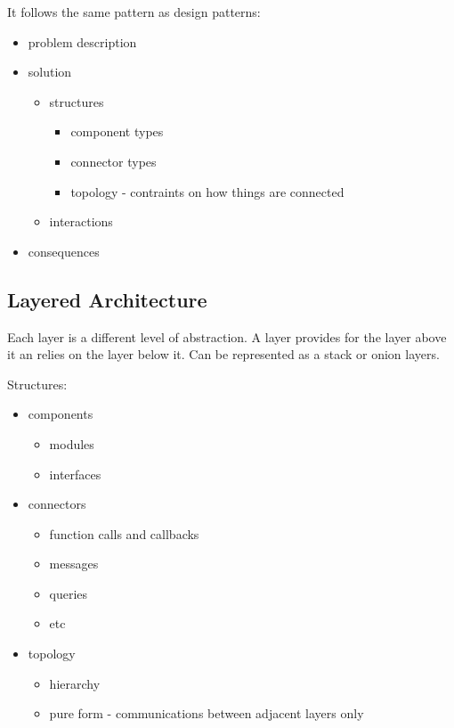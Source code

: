 \documentclass{article}
\begin{document}
It follows the same pattern as design patterns:
\begin{itemize}
    \item problem description
    \item solution
    \begin{itemize}
         \item structures
         \begin{itemize}
             \item component types
             \item connector types
             \item topology - contraints on how things are connected
         \end{itemize}
         \item interactions
     \end{itemize}
    \item consequences
\end{itemize}

\subsection*{Layered Architecture} %
\label{sub:layered_architecture}
Each layer is a different level of abstraction. A layer provides for the layer above it an relies on the layer below it. Can be represented as a stack or onion layers.

Structures:
\begin{itemize}
    \item components
    \begin{itemize}
        \item modules
        \item interfaces
    \end{itemize}
    \item connectors
    \begin{itemize}
        \item function calls and callbacks
        \item messages
        \item queries
        \item etc
    \end{itemize}
    \item topology
    \begin{itemize}
        \item hierarchy
        \item pure form - communications between adjacent layers only
    \end{itemize}
\end{itemize}
\end{document}
